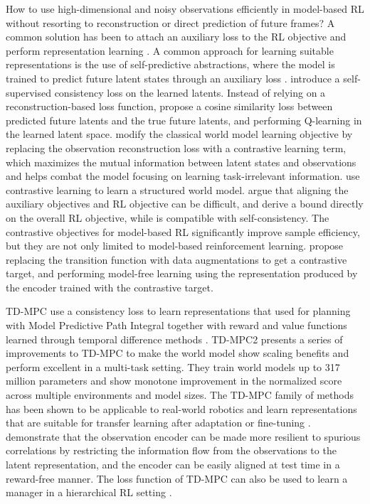 \documentclass{article}
\theoremstyle{plain}
\theoremstyle{definition}
\theoremstyle{remark}
\begin{document}
How to use high-dimensional and noisy observations efficiently in model-based RL without resorting to reconstruction or direct prediction of future frames? A common solution has been to attach an auxiliary loss to the RL objective and perform representation learning \cite{tomar2021learning}. A common approach for learning suitable representations is the use of self-predictive abstractions, where the model is trained to predict future latent states through an auxiliary loss \cite{subramanian2022approximate, ni2024bridging}. \citet{ye2021mastering} introduce a self-supervised consistency loss on the learned latents. Instead of relying on a reconstruction-based loss function, \citet{schwarzer2020data} propose a cosine similarity loss between predicted future latents and the true future latents, and performing Q-learning in the learned latent space. \citet{ma2021contrastive} modify the classical world model learning objective by replacing the observation reconstruction loss with a contrastive learning term, which maximizes the mutual information between latent states and observations and helps combat the model focusing on learning task-irrelevant information. \citet{kipf2019contrastive} use contrastive learning to learn a structured world model. \citet{ghugare2022simplifying} argue that aligning the auxiliary objectives and RL objective can be difficult, and derive a bound directly on the overall RL objective, while is compatible with self-consistency. The contrastive objectives for model-based RL significantly improve sample efficiency, but they are not only limited to model-based reinforcement learning. \citet{laskinCURLContrastiveUnsupervised2020} propose replacing the transition function with data augmentations to get a contrastive target, and performing model-free learning using the representation produced by the encoder trained with the contrastive target.

TD-MPC \cite{hansenTemporalDifferenceLearning2022} use a consistency loss to learn representations that used for planning with Model Predictive Path Integral together with reward and value functions learned through temporal difference methods \cite{williams2015model}. TD-MPC2 \cite{hansen2023td} presents a series of improvements to TD-MPC to make the world model show scaling benefits and perform excellent in a multi-task setting. They train world models up to 317 million parameters and show monotone improvement in the normalized score across multiple environments and model sizes. The TD-MPC family of methods has been shown to be applicable to real-world robotics \cite{lancaster2023modem} and learn representations that are suitable for transfer learning after adaptation \cite{yang2023movie} or fine-tuning \cite{feng2023finetuning}. \citet{zhu2023repo} demonstrate that the observation encoder can be made more resilient to spurious correlations by restricting the information flow from the observations to the latent representation, and the encoder can be easily aligned at test time in a reward-free manner. The loss function of TD-MPC can also be used to learn a manager in a hierarchical RL setting \cite{chitnis2023iql}.
\end{document}
